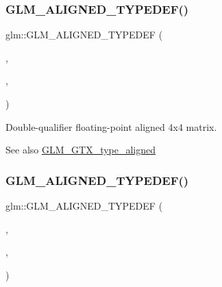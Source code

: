\subsubsection{\texorpdfstring{G\+L\+M\+\_\+\+A\+L\+I\+G\+N\+E\+D\+\_\+\+T\+Y\+P\+E\+D\+E\+F()}{GLM\_ALIGNED\_TYPEDEF()}\hspace{0.1cm}{\footnotesize\ttfamily [195/209]}}
{\footnotesize\ttfamily glm\+::\+G\+L\+M\+\_\+\+A\+L\+I\+G\+N\+E\+D\+\_\+\+T\+Y\+P\+E\+D\+EF (\begin{DoxyParamCaption}\item[{\mbox{\hyperlink{group__gtc__type__precision_ga5fc21633b1546e4599609c47b4c8dac4}{f64mat4x4}}}]{,  }\item[{aligned\+\_\+f64mat4}]{,  }\item[{32}]{ }\end{DoxyParamCaption})}

Double-\/qualifier floating-\/point aligned 4x4 matrix. \begin{DoxySeeAlso}{See also}
\mbox{\hyperlink{group__gtx__type__aligned}{G\+L\+M\+\_\+\+G\+T\+X\+\_\+type\+\_\+aligned}} 
\end{DoxySeeAlso}
\mbox{\label{group__gtx__type__aligned_gadbd2c639c03de1c3e9591b5a39f65559}} 
\subsubsection{\texorpdfstring{G\+L\+M\+\_\+\+A\+L\+I\+G\+N\+E\+D\+\_\+\+T\+Y\+P\+E\+D\+E\+F()}{GLM\_ALIGNED\_TYPEDEF()}\hspace{0.1cm}{\footnotesize\ttfamily [196/209]}}
{\footnotesize\ttfamily glm\+::\+G\+L\+M\+\_\+\+A\+L\+I\+G\+N\+E\+D\+\_\+\+T\+Y\+P\+E\+D\+EF (\begin{DoxyParamCaption}\item[{\mbox{\hyperlink{group__gtc__type__precision_gae18de078e2885803ceda215c6e04a08a}{f64mat2x2}}}]{,  }\item[{aligned\+\_\+f64mat2x2}]{,  }\item[{32}]{ }\end{DoxyParamCaption})}


